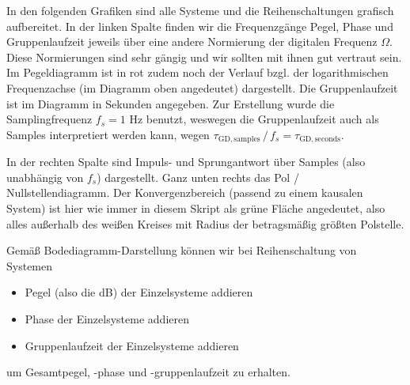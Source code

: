 \begin{Loesung}
\begin{center}
\end{center}

In den folgenden Grafiken sind alle Systeme und die Reihenschaltungen
grafisch aufbereitet.
In der linken Spalte finden wir die Frequenzgänge Pegel, Phase und Gruppenlaufzeit
jeweils über eine andere Normierung der digitalen Frequenz $\Omega$.
Diese Normierungen sind sehr gängig und wir sollten mit ihnen gut vertraut sein.
Im Pegeldiagramm ist in rot zudem noch der Verlauf bzgl. der logarithmischen
Frequenzachse (im Diagramm oben angedeutet) dargestellt.
Die Gruppenlaufzeit ist im Diagramm in Sekunden angegeben. Zur Erstellung
wurde die Samplingfrequenz $f_s=1$ Hz benutzt, weswegen
die Gruppenlaufzeit auch als Samples interpretiert werden kann, wegen
$\tau_\mathrm{GD,samples} \,/\, f_s = \tau_\mathrm{GD,seconds}$.

In der rechten Spalte sind Impuls- und Sprungantwort über Samples (also unabhängig
von $f_s$) dargestellt. Ganz unten rechts das Pol / Nullstellendiagramm.
Der Konvergenzbereich (passend zu einem kausalen System)
ist hier wie immer in diesem Skript als grüne Fläche angedeutet, also alles außerhalb
des weißen Kreises mit Radius der betragsmäßig größten Polstelle.

Gemäß Bodediagramm-Darstellung können wir bei Reihenschaltung von Systemen
\begin{itemize}
  \item Pegel (also die dB) der Einzelsysteme addieren
  \item Phase der Einzelsysteme addieren
  \item Gruppenlaufzeit der Einzelsysteme addieren
\end{itemize}
um Gesamtpegel, -phase und -gruppenlaufzeit zu erhalten.


\end{Loesung}
